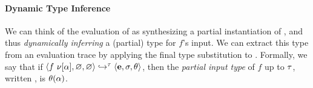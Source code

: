 \paragraph{Dynamic Type Inference}
We can think of the evaluation of 
as synthesizing a partial instantiation of \thole, and thus
\emph{dynamically inferring} a (partial) type for $f$'s input.
%
We can extract this type from an evaluation trace by
applying the final type substitution to \thole.
%
Formally, we say that if
$\langle f\ \nu[\alpha], \varnothing, \varnothing \rangle \hookrightarrow^{\tau} \langle \mathbf{e}, \sigma, \theta \rangle$,
then the \emph{partial input type} of $f$ up to $\tau$, written
, is $\theta(\alpha)$.




%



